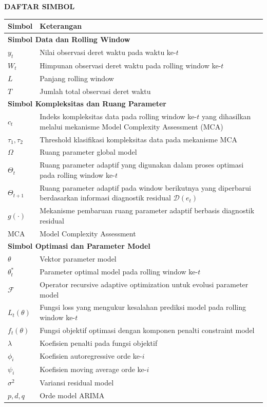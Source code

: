 \begin{center}
    \Large\textbf{DAFTAR SIMBOL}
\end{center}

\renewcommand{\arraystretch}{1.2}

\setlength{\LTleft}{0pt}
\setlength{\LTright}{0pt}

\begin{longtable}{p{2.8cm} p{10.8cm}}

\textbf{Simbol} & \textbf{Keterangan} \\ \hline

\multicolumn{2}{l}{\bfseries Simbol Data dan Rolling Window} \\ \hline
$y_t$ & Nilai observasi deret waktu pada waktu ke-$t$ \\
$W_t$ & Himpunan observasi deret waktu pada rolling window ke-$t$ \\
$L$ & Panjang rolling window \\
$T$ & Jumlah total observasi deret waktu \\

\multicolumn{2}{l}{\bfseries Simbol Kompleksitas dan Ruang Parameter} \\ \hline
$c_t$ & Indeks kompleksitas data pada rolling window ke-$t$ yang dihasilkan melalui mekanisme Model Complexity Assessment (MCA) \\
$\tau_1,\tau_2$ & Threshold klasifikasi kompleksitas data pada mekanisme MCA \\
$\Omega$ & Ruang parameter global model \\
$\Theta_t$ & Ruang parameter adaptif yang digunakan dalam proses optimasi pada rolling window ke-$t$ \\
$\Theta_{t+1}$ & Ruang parameter adaptif pada window berikutnya yang diperbarui berdasarkan informasi diagnostik residual $\mathcal{D}(e_t)$ \\
$g(\cdot)$ & Mekanisme pembaruan ruang parameter adaptif berbasis diagnostik residual \\
MCA & Model Complexity Assessment \\

\multicolumn{2}{l}{\bfseries Simbol Optimasi dan Parameter Model} \\ \hline
$\theta$ & Vektor parameter model \\
$\theta_t^*$ & Parameter optimal model pada rolling window ke-$t$ \\
$\mathcal{F}$ & Operator recursive adaptive optimization untuk evolusi parameter model \\
$L_t(\theta)$ & Fungsi loss yang mengukur kesalahan prediksi model pada rolling window ke-$t$ \\
$f_t(\theta)$ & Fungsi objektif optimasi dengan komponen penalti constraint model \\
$\lambda$ & Koefisien penalti pada fungsi objektif \\
$\phi_i$ & Koefisien autoregressive orde ke-$i$ \\
$\psi_i$ & Koefisien moving average orde ke-$i$ \\
$\sigma^2$ & Variansi residual model \\
$p,d,q$ & Orde model ARIMA \\


\end{longtable}
